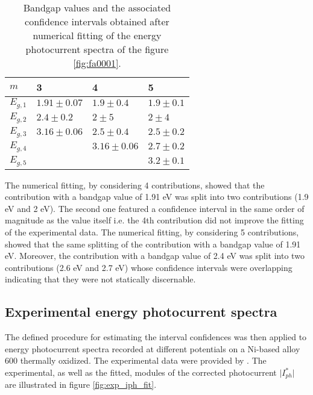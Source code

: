 \begin{table}[htb]
\small
\centering
\begin{tabular}{ p{2cm}|p{4cm}|p{4cm}| p{4cm}}
\toprule
 $m$ & 3 & 4 &  5\\
\midrule
$E_{g,1}$ & $1.91 \pm 0.07$    & $1.9 \pm 0.4$      & $1.9 \pm 0.1$ \\
$E_{g,2}$ &  $2.4 \pm 0.2$      & $2 \pm 5$           & $2 \pm 4$\\
$E_{g,3}$ & $3.16 \pm 0.06$    & $2.5 \pm 0.4$     &  $2.5 \pm 0.2$\\
$E_{g,4}$ &                           &  $3.16 \pm 0.06$ &   $2.7 \pm 0.2$    \\
$E_{g,5}$ &                           &                         &    $3.2 \pm 0.1$     \\
 \bottomrule
\end{tabular}
\caption{Bandgap values and the associated confidence intervals obtained after 
    numerical fitting of the energy photocurrent spectra of the figure \ref{fig:fa0001}.}
\label{table:result_noise_contributions}
\end{table}

The numerical fitting, by considering 4 contributions, showed that the contribution 
with a bandgap value of 1.91 
eV was split into two contributions (1.9 eV and 2 eV). The second one featured 
a confidence interval in the same 
order of magnitude as the value itself i.e. the 4th contribution did not 
improve the fitting of the experimental 
data. 
The numerical fitting, by considering 5 contributions, showed that the same 
splitting of the contribution with a 
bandgap value of 1.91 eV. Moreover, the contribution with a bandgap value 
of 2.4 eV was split into two contributions (2.6 eV and 2.7 eV) whose confidence 
intervals were overlapping indicating that they were not statically discernable.

\clearpage
\subsection{Experimental energy photocurrent spectra}
The defined procedure for estimating the interval confidences was then applied 
to energy photocurrent spectra recorded at different potentials on a Ni-based 
alloy 600 thermally oxidized. The experimental data were provided by \citet{petit2013}. 
The experimental, as well as the fitted, modules of the corrected photocurrent 
$\vert I_{ph}^* \vert$ are illustrated in figure \ref{fig:exp_iph_fit}. 

